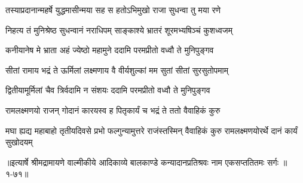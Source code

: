 \twolineshloka
{तस्याप्रदानान्महर्षे युद्धमासीन्मया सह}
{स हतोऽभिमुखो राजा सुधन्वा तु मया रणे} %

\twolineshloka
{निहत्य तं मुनिश्रेष्ठ सुधन्वानं नराधिपम्}
{साङ्काश्ये भ्रातरं शूरमभ्यषिञ्चं कुशध्वजम्} %

\twolineshloka
{कनीयानेष मे भ्राता अहं ज्येष्ठो महामुने}
{ददामि परमप्रीतो वध्वौ ते मुनिपुङ्गव} %

\twolineshloka
{सीतां रामाय भद्रं ते ऊर्मिलां लक्ष्मणाय वै}
{वीर्यशुल्कां मम सुतां सीतां सुरसुतोपमाम्} %

\twolineshloka
{द्वितीयामूर्मिलां चैव त्रिर्वदामि न संशयः}
{ददामि परमप्रीतो वध्वौ ते मुनिपुङ्गव} %

\twolineshloka
{रामलक्ष्मणयो राजन् गोदानं कारयस्व ह}
{पितृकार्यं च भद्रं ते ततो वैवाहिकं कुरु} %

\threelineshloka
{मघा ह्यद्य महाबाहो तृतीयदिवसे प्रभो}
{फल्गुन्यामुत्तरे राजंस्तस्मिन् वैवाहिकं कुरु}
{रामलक्ष्मणयोरर्थे दानं कार्यं सुखोदयम्} %


॥इत्यार्षे श्रीमद्रामायणे वाल्मीकीये आदिकाव्ये बालकाण्डे कन्यादानप्रतिश्रवः नाम एकसप्ततितमः सर्गः ॥१-७१॥
